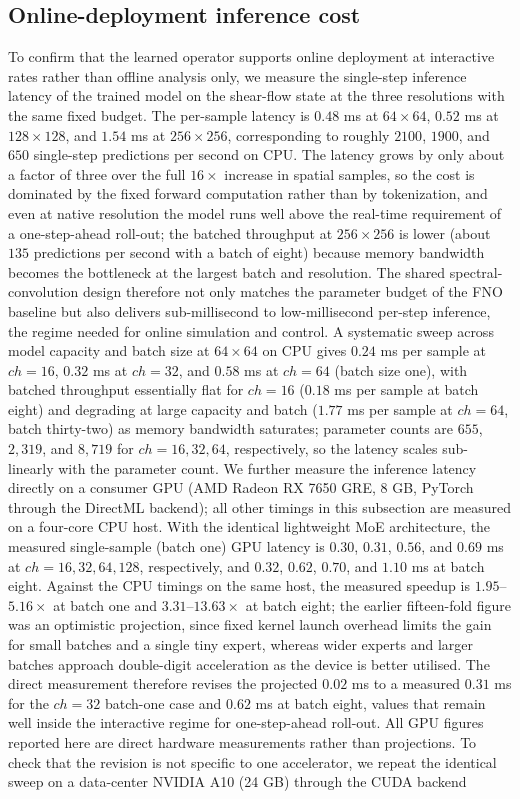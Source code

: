\documentclass[preprint,12pt]{elsarticle}
\begin{document}
\subsection{Online-deployment inference cost}
To confirm that the learned operator supports online deployment at interactive rates rather than offline analysis only, we measure the single-step inference latency of the trained model on the shear-flow state at the three resolutions with the same fixed budget. The per-sample latency is $0.48$ ms at $64\times64$, $0.52$ ms at $128\times128$, and $1.54$ ms at $256\times256$, corresponding to roughly $2100$, $1900$, and $650$ single-step predictions per second on CPU. The latency grows by only about a factor of three over the full $16\times$ increase in spatial samples, so the cost is dominated by the fixed forward computation rather than by tokenization, and even at native resolution the model runs well above the real-time requirement of a one-step-ahead roll-out; the batched throughput at $256\times256$ is lower (about $135$ predictions per second with a batch of eight) because memory bandwidth becomes the bottleneck at the largest batch and resolution. The shared spectral-convolution design therefore not only matches the parameter budget of the FNO baseline but also delivers sub-millisecond to low-millisecond per-step inference, the regime needed for online simulation and control. A systematic sweep across model capacity and batch size at $64\times64$ on CPU gives $0.24$ ms per sample at $ch=16$, $0.32$ ms at $ch=32$, and $0.58$ ms at $ch=64$ (batch size one), with batched throughput essentially flat for $ch=16$ ($0.18$ ms per sample at batch eight) and degrading at large capacity and batch ($1.77$ ms per sample at $ch=64$, batch thirty-two) as memory bandwidth saturates; parameter counts are $655$, $2{,}319$, and $8{,}719$ for $ch=16,32,64$, respectively, so the latency scales sub-linearly with the parameter count. We further measure the inference latency directly on a consumer GPU (AMD Radeon RX 7650 GRE, 8 GB, PyTorch through the DirectML backend); all other timings in this subsection are measured on a four-core CPU host. With the identical lightweight MoE architecture, the measured single-sample (batch one) GPU latency is $0.30$, $0.31$, $0.56$, and $0.69$ ms at $ch=16,32,64,128$, respectively, and $0.32$, $0.62$, $0.70$, and $1.10$ ms at batch eight. Against the CPU timings on the same host, the measured speedup is $1.95$--$5.16\times$ at batch one and $3.31$--$13.63\times$ at batch eight; the earlier fifteen-fold figure was an optimistic projection, since fixed kernel launch overhead limits the gain for small batches and a single tiny expert, whereas wider experts and larger batches approach double-digit acceleration as the device is better utilised. The direct measurement therefore revises the projected $0.02$ ms to a measured $0.31$ ms for the $ch=32$ batch-one case and $0.62$ ms at batch eight, values that remain well inside the interactive regime for one-step-ahead roll-out. All GPU figures reported here are direct hardware measurements rather than projections. To check that the revision is not specific to one accelerator, we repeat the identical sweep on a data-center NVIDIA A10 (24 GB) through the CUDA backend 
\end{document}
